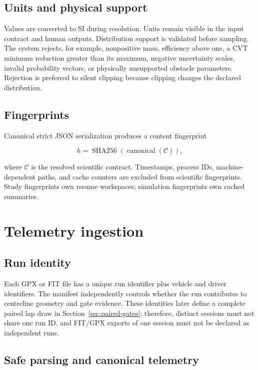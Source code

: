 \documentclass[11pt,oneside]{report}
\begin{document}
\section{Units and physical support}

Values are converted to SI during resolution.  Units remain visible in the input
contract and human outputs.  Distribution support is validated before sampling.  The
system rejects, for example, nonpositive mass, efficiency above one, a CVT minimum
reduction greater than its maximum, negative uncertainty scales, invalid probability
vectors, or physically unsupported obstacle parameters.  Rejection is preferred to
silent clipping because clipping changes the declared distribution.

\section{Fingerprints}

Canonical strict JSON serialization produces a content fingerprint

\begin{equation}
h = \operatorname{SHA256}\!\left(\operatorname{canonical}(\mathcal{C})\right),
\end{equation}

where $\mathcal{C}$ is the resolved scientific contract.  Timestamps, process IDs,
machine-dependent paths, and cache counters are excluded from scientific fingerprints.
Study fingerprints own resume workspaces; simulation fingerprints own cached summaries.

\chapter{Telemetry ingestion}\label{ch:gpx}

\section{Run identity}

Each GPX or FIT file has a unique run identifier plus vehicle and driver identifiers.  The
manifest independently controls whether the run contributes to centreline geometry and
gate evidence.  These identities later define a complete paired lap draw in
Section~\ref{sec:paired-gates}; therefore, distinct sessions must not share one run ID,
and FIT/GPX exports of one session must not be declared as independent runs.

\section{Safe parsing and canonical telemetry}
\end{document}
